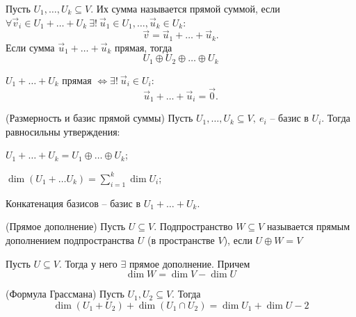 \begin{multicols}{2}
\begin{definition}{}{}
    Пусть $U_1, \ldots, U_k \subseteq V$. Их сумма называется прямой суммой, если $\forall \vec{v}_i \in U_1 + \ldots + U_k\  \exists !\  \vec{u}_1 \in U_1, \ldots, \vec{u}_k \in U_k:$
    \[
        \vec{v} = \vec{u}_1 + \ldots + \vec{u}_k.
        \]
    Если сумма $\vec{u}_1 + \ldots + \vec{u}_k$ прямая, тогда 
    \[
        U_1 \oplus U_2 \oplus \ldots \oplus U_k
        \]
\end{definition}
\begin{proposition}{}{}
    $U_1 + \ldots + U_k$ прямая $\Longleftrightarrow \exists !\ \vec{u}_i \in U_i:$ 
    \[
        \vec{u}_1 + \ldots + \vec{u}_i = \vec{0}.
        \] 
\end{proposition}
\begin{theorema}{(Размерность и базис прямой суммы)}{}
    Пусть $U_1, \ldots, U_k \subseteq V, \ e_i$ -- базис в $U_i$. Тогда равносильны утверждения:
    \begin{enumerate*}
        \item $U_1 + \ldots + U_k = U_1 \oplus \ldots \oplus U_k$;
        \item $\dim(U_{1} + \ldots U_{k}) = \sum\limits_{i=1}^k \dim U_i$;
        \item Конкатенация базисов  -- базис в $U_1 + \ldots + U_k$.
    \end{enumerate*}
\end{theorema}
\begin{definition}{(Прямое дополнение)}{}
    Пусть $U \subseteq V$. Подпространство $W \subseteq V$ называется прямым дополнением подпространства $U$ (в пространстве $V$), если $U \oplus W = V$
\end{definition}
\begin{proposition}{}{}
    Пусть $U \subseteq V$. Тогда у него $\exists$ прямое дополнение. Причем 
    \[
        \dim W = \dim V - \dim U
        \]
\end{proposition}
\begin{theorema}{(Формула Грассмана)}{}
    Пусть $U_1, U_2 \subseteq V$. Тогда 
    \[
        \dim (U_1 + U_2) + \dim (U_1 \cap U_2) = \dim U_1 + \dim U-2
        \]
\end{theorema}

\end{multicols}
